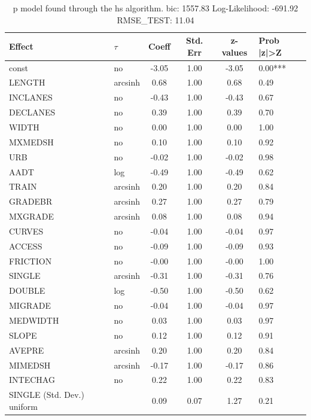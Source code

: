 \begin{table}
	\caption{p model found through the hs algorithm. bic: 1557.83 Log-Likelihood: -691.92 RMSE_TEST: 11.04}
	\begin{center}
		\begin{tabular}{|l|l|c|c|c|l|}
			\hline
			Effect & $\tau$ & Coeff & Std. Err & z-values & Prob |z|>Z \\
			\hline
			const & no & -3.05 & 1.00 & -3.05 & 0.00*** \\
			\hline
			LENGTH & arcsinh & 0.68 & 1.00 & 0.68 & 0.49 \\
			\hline
			INCLANES & no & -0.43 & 1.00 & -0.43 & 0.67 \\
			\hline
			DECLANES & no & 0.39 & 1.00 & 0.39 & 0.70 \\
			\hline
			WIDTH & no & 0.00 & 1.00 & 0.00 & 1.00 \\
			\hline
			MXMEDSH & no & 0.10 & 1.00 & 0.10 & 0.92 \\
			\hline
			URB & no & -0.02 & 1.00 & -0.02 & 0.98 \\
			\hline
			AADT & log & -0.49 & 1.00 & -0.49 & 0.62 \\
			\hline
			TRAIN & arcsinh & 0.20 & 1.00 & 0.20 & 0.84 \\
			\hline
			GRADEBR & arcsinh & 0.27 & 1.00 & 0.27 & 0.79 \\
			\hline
			MXGRADE & arcsinh & 0.08 & 1.00 & 0.08 & 0.94 \\
			\hline
			CURVES & no & -0.04 & 1.00 & -0.04 & 0.97 \\
			\hline
			ACCESS & no & -0.09 & 1.00 & -0.09 & 0.93 \\
			\hline
			FRICTION & no & -0.00 & 1.00 & -0.00 & 1.00 \\
			\hline
			SINGLE & arcsinh & -0.31 & 1.00 & -0.31 & 0.76 \\
			\hline
			DOUBLE & log & -0.50 & 1.00 & -0.50 & 0.62 \\
			\hline
			MIGRADE & no & -0.04 & 1.00 & -0.04 & 0.97 \\
			\hline
			MEDWIDTH & no & 0.03 & 1.00 & 0.03 & 0.97 \\
			\hline
			SLOPE & no & 0.12 & 1.00 & 0.12 & 0.91 \\
			\hline
			AVEPRE & arcsinh & 0.20 & 1.00 & 0.20 & 0.84 \\
			\hline
			MIMEDSH & arcsinh & -0.17 & 1.00 & -0.17 & 0.86 \\
			\hline
			INTECHAG & no & 0.22 & 1.00 & 0.22 & 0.83 \\
			\hline
			SINGLE (Std. Dev.) uniform &  & 0.09 & 0.07 & 1.27 & 0.21 \\

\end{tabular}
\end{center}
\end{table}
